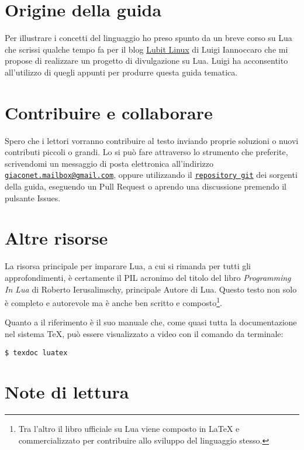 \section{Origine della guida}

Per illustrare i concetti del linguaggio ho preso spunto da un breve corso su
Lua che scrissi qualche tempo fa per il blog
\href{http://parliamodi-ubuntu.blogspot.it}{Lubit Linux} di Luigi Iannoccaro
che mi propose di realizzare un progetto di divulgazione su Lua. Luigi ha
acconsentito all'utilizzo di quegli appunti per produrre questa guida tematica.


\section{Contribuire e collaborare}

Spero che i lettori vorranno contribuire al testo inviando proprie soluzioni o
nuovi contributi piccoli o grandi. Lo si può fare attraverso lo strumento che
preferite, scrivendomi un messaggio di posta elettronica all'indirizzo
\href{mailto:giaconet.mailbox@gmail.com}{\texttt{giaconet.mailbox@gmail.com}},
oppure utilizzando il
\href{https://github.com/GuITeX/guidalua}{\texttt{repository git}} dei sorgenti
della guida, eseguendo un Pull Request o aprendo una discussione premendo il
pulsante Issues.


\section{Altre risorse}

La risorsa principale per imparare Lua, a cui si rimanda per tutti gli
approfondimenti, è certamente il PIL acronimo del titolo del libro
\emph{Programming In Lua} di Roberto Ierusalimschy, principale Autore
di Lua. Questo testo non solo è completo e autorevole ma è anche ben scritto e
composto\footnote{Tra l'altro il libro ufficiale su Lua viene composto in
\LaTeX{} e commercializzato per contribuire allo sviluppo del linguaggio
stesso.}.

Quanto a \LuaTeX{} il riferimento è il suo manuale che, come quasi tutta la
documentazione nel sistema \TeX{}, può essere visualizzato a video con il
comando da terminale:
\begin{Verbatim}[numbers=none]
$ texdoc luatex
\end{Verbatim}


\section{Note di lettura}

